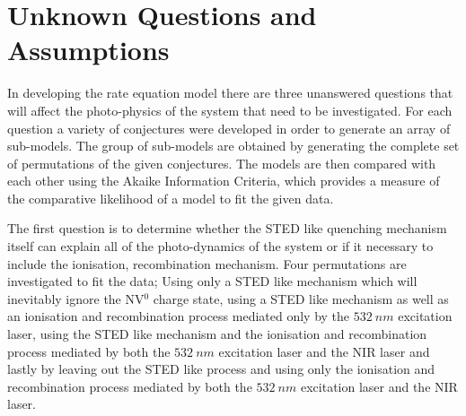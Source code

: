 \documentclass[prl]{revtex4}
\begin{document}
\section{Unknown Questions and Assumptions }
In developing the rate equation model there are three unanswered questions that will affect the photo-physics of the system that need to be investigated. For each question a variety of conjectures were developed in order to generate an array of sub-models. The group of sub-models are obtained by generating the complete set of permutations of the given conjectures. The models are then compared with each other using the Akaike Information Criteria, which provides a measure of the comparative likelihood of a model to fit the given data.

The first question is to determine whether the STED like quenching mechanism itself can explain all of the photo-dynamics of the system or if it necessary to include the ionisation, recombination mechanism. Four permutations are investigated to fit the data; Using only a STED like mechanism which will inevitably ignore the NV$^0$ charge state, using a STED like mechanism as well as an ionisation and recombination process mediated only by the $\SI{532}{nm}$ excitation laser, using the STED like mechanism and the ionisation and recombination process mediated by both the $\SI{532}{nm}$ excitation laser and the NIR laser and lastly by leaving out the STED like process and using only the ionisation and recombination process mediated by both the $\SI{532}{nm}$ excitation laser and the NIR laser.
\end{document}
